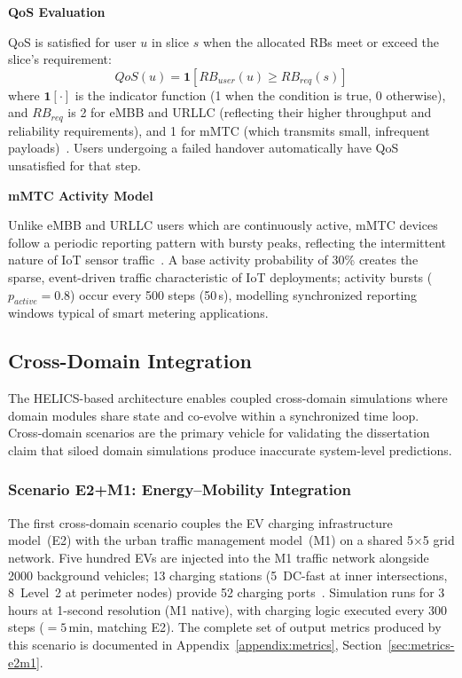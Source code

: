 \medskip\noindent\textbf{QoS Evaluation}

QoS is satisfied for user $u$ in slice $s$ when the allocated RBs meet or exceed the slice's requirement:
\begin{equation}
    QoS(u) = \mathbf{1}\!\left[RB_{user}(u) \geq RB_{req}(s)\right]
    \label{eq:qos_t1}
\end{equation}
where $\mathbf{1}[\cdot]$ is the indicator function (1 when the condition is true, 0 otherwise), and $RB_{req}$ is 2 for eMBB and URLLC (reflecting their higher throughput and reliability requirements), and 1 for mMTC (which transmits small, infrequent payloads)~\cite{3gpp_23501}. Users undergoing a failed handover automatically have QoS unsatisfied for that step.

\medskip\noindent\textbf{mMTC Activity Model}

Unlike eMBB and URLLC users which are continuously active, mMTC devices follow a periodic reporting pattern with bursty peaks, reflecting the intermittent nature of IoT sensor traffic~\cite{telecom_challenges}. A base activity probability of 30\% creates the sparse, event-driven traffic characteristic of IoT deployments; activity bursts ($p_{active} = 0.8$) occur every 500 steps (50\,s), modelling synchronized reporting windows typical of smart metering applications.


\subsection{Cross-Domain Integration}

The HELICS-based architecture enables coupled cross-domain simulations where domain modules share state and co-evolve within a synchronized time loop. Cross-domain scenarios are the primary vehicle for validating the dissertation claim that siloed domain simulations produce inaccurate system-level predictions.

\subsubsection{Scenario E2+M1: Energy--Mobility Integration}
\label{sec:scenario-e2m1}

The first cross-domain scenario couples the EV charging infrastructure model~(E2) with the urban traffic management model~(M1) on a shared 5$\times$5 grid network. Five hundred EVs are injected into the M1 traffic network alongside 2000 background vehicles; 13 charging stations (5~DC-fast at inner intersections, 8~Level~2 at perimeter nodes) provide 52 charging ports~\cite{helics_ev_transport}. Simulation runs for 3 hours at 1-second resolution (M1 native), with charging logic executed every 300 steps ($= 5$\,min, matching E2). The complete set of output metrics produced by this scenario is documented in Appendix~\ref{appendix:metrics}, Section~\ref{sec:metrics-e2m1}.

